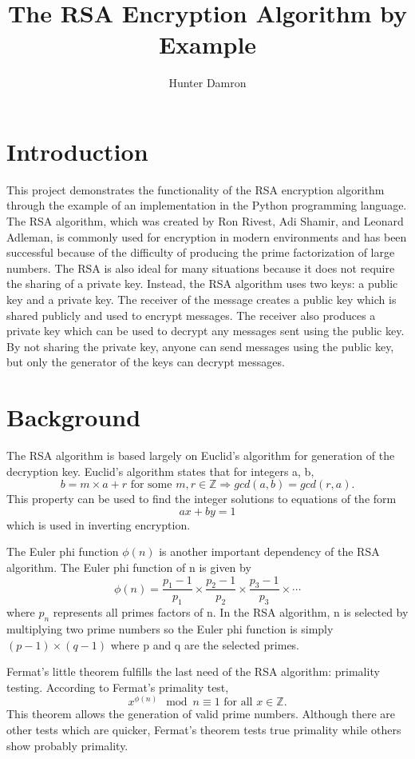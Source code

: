 \documentclass{article}
\title{
	The RSA Encryption Algorithm by Example
}
\author{Hunter Damron}
\newcommand{\Z}{\mathbb{Z}}
\begin{document}
	\maketitle

	\tableofcontents
	
	\section{Introduction}
		This project demonstrates the functionality of the RSA encryption algorithm through the example of an implementation in the Python programming language. The RSA algorithm, which was created by Ron Rivest, Adi Shamir, and Leonard Adleman, is commonly used for encryption in modern environments and has been successful because of the difficulty of producing the prime factorization of large numbers. The RSA is also ideal for many situations because it does not require the sharing of a private key. Instead, the RSA algorithm uses two keys: a public key and a private key. The receiver of the message creates a public key which is shared publicly and used to encrypt messages. The receiver also produces a private key which can be used to decrypt any messages sent using the public key. By not sharing the private key, anyone can send messages using the public key, but only the generator of the keys can decrypt messages. 
		
	\section{Background}
		The RSA algorithm is based largely on Euclid's algorithm for generation of the decryption key. Euclid's algorithm states that for integers a, b, \[ b = m \times a + r \text{ for some } m,r \in \Z \Rightarrow gcd(a,b) = gcd(r,a). \] This property can be used to find the integer solutions to equations of the form \[ ax + by = 1 \] which is used in inverting encryption. 
		
		The Euler phi function $\phi(n)$ is another important dependency of the RSA algorithm. The Euler phi function of n is given by \[ \phi(n) = \frac{p_1-1}{p_1} \times \frac{p_2-1}{p_2} \times \frac{p_3-1}{p_3} \times \cdots \] where $p_n$ represents all primes factors of n. In the RSA algorithm, n is selected by multiplying two prime numbers so the Euler phi function is simply $(p-1) \times (q-1)$ where p and q are the selected primes.
		
		Fermat's little theorem fulfills the last need of the RSA algorithm: primality testing. According to Fermat's primality test, \[ x^{\phi(n)} \mod n \equiv 1 \text{ for all } x \in \Z. \] This theorem allows the generation of valid prime numbers. Although there are other tests which are quicker, Fermat's theorem tests true primality while others show probably primality.
		
\end{document}
